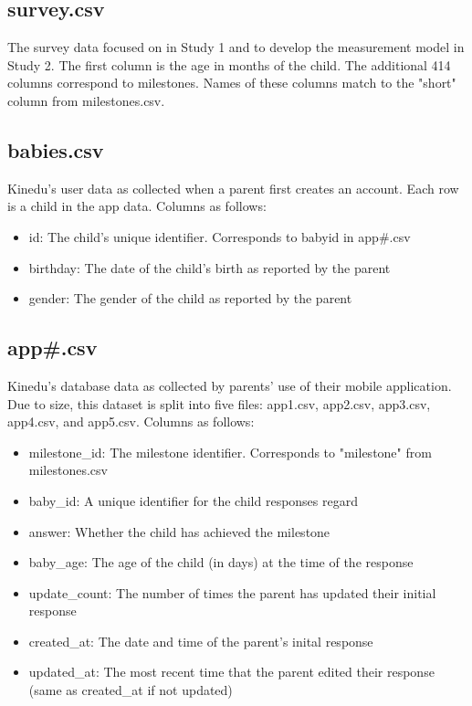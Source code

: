\documentclass[11pt]{article}
\begin{document}
\subsection*{survey.csv}

The survey data focused on in Study 1 and to develop the measurement model in Study 2. The first column is the age in months of the child. The additional 414 columns correspond to milestones. Names of these columns match to the "short" column from milestones.csv.

\subsection*{babies.csv}

Kinedu's user data as collected when a parent first creates an account. Each row is a child in the app data. Columns as follows:

\begin{itemize}
\item id: The child's unique identifier. Corresponds to babyid in app\#.csv
\item birthday: The date of the child's birth as reported by the parent
\item gender: The gender of the child as reported by the parent
\end{itemize}

\subsection*{app\#.csv}

Kinedu's database data as collected by parents' use of their mobile application. Due to size, this dataset is split into five files: app1.csv, app2.csv, app3.csv, app4.csv, and app5.csv. Columns as follows:

\begin{itemize}
\item milestone\_id: The milestone identifier. Corresponds to "milestone" from milestones.csv
\item baby\_id: A unique identifier for the child responses regard
\item answer: Whether the child has achieved the milestone
\item baby\_age: The age of the child (in days) at the time of the response
\item update\_count: The number of times the parent has updated their initial response
\item created\_at: The date and time of the parent's inital response
\item updated\_at: The most recent time that the parent edited their response (same as created\_at if not updated)
\end{itemize}
\end{document}
